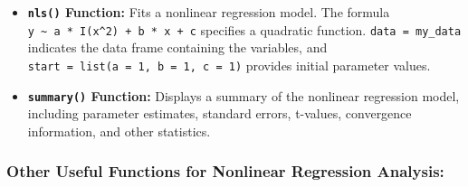 \documentclass[
]{article}
\begin{document}
\begin{itemize}
\item
  \textbf{\texttt{nls()} Function:} Fits a nonlinear regression model.
  The formula
  \texttt{y\ \textasciitilde{}\ a\ *\ I(x\^{}2)\ +\ b\ *\ x\ +\ c}
  specifies a quadratic function. \texttt{data\ =\ my\_data} indicates
  the data frame containing the variables, and
  \texttt{start\ =\ list(a\ =\ 1,\ b\ =\ 1,\ c\ =\ 1)} provides initial
  parameter values.
\item
  \textbf{\texttt{summary()} Function:} Displays a summary of the
  nonlinear regression model, including parameter estimates, standard
  errors, t-values, convergence information, and other statistics.
\end{itemize}

\hypertarget{other-useful-functions-for-nonlinear-regression-analysis}{%
\subsubsection{Other Useful Functions for Nonlinear Regression
Analysis:}\label{other-useful-functions-for-nonlinear-regression-analysis}}
\end{document}

